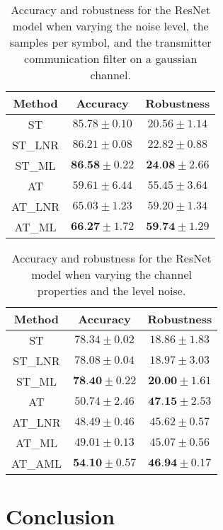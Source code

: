 \documentclass[conference]{IEEEtran}
\begin{document}
\begin{table}[htbp]
	\centering
	\begin{tabular}{c|cc}
	    Method & Accuracy & Robustness \\
		\hline
		ST & $85.78 \pm 0.10$ & $20.56 \pm 1.14$ \\ 
		ST\_LNR & $86.21 \pm 0.08$ & $22.82 \pm 0.88$ \\ 
		ST\_ML & $\textbf{86.58} \pm 0.22$ & $\textbf{24.08} \pm 2.66$ \\
        \hline
		AT & $59.61 \pm 6.44$ & $55.45 \pm 3.64$ \\ 
		AT\_LNR & $65.03 \pm 1.23$ & $59.20 \pm 1.34$ \\ 
		AT\_ML & $\textbf{66.27} \pm 1.72$ & $\textbf{59.74} \pm 1.29$ \\ 
    \end{tabular}
    \caption{Accuracy and robustness for the ResNet model when varying the noise level, the samples per symbol, and the transmitter communication filter on a gaussian channel.}
    \label{tab:sawgn2p}
\end{table}

\begin{table}[htbp]
	\centering
	\begin{tabular}{c|cc}
	    Method & Accuracy & Robustness \\
		\hline
		ST & $78.34 \pm 0.02$ & $18.86 \pm 1.83$ \\ 
		ST\_LNR & $78.08 \pm 0.04$ & $18.97 \pm 3.03$ \\ 
		ST\_ML & $\textbf{78.40} \pm 0.22$ & $\textbf{20.00} \pm 1.61$ \\
		\hline
		AT & $50.74 \pm 2.46$ & $\textbf{47.15} \pm 2.53$ \\ 
		AT\_LNR & $48.49 \pm 0.46$ & $45.62 \pm 0.57$ \\ 
		AT\_ML & $49.01 \pm 0.13$ & $45.07 \pm 0.56$ \\  
		AT\_AML & $\textbf{54.10} \pm 0.57$ & $\textbf{46.94} \pm 0.17$ \\ 
    \end{tabular}
    \caption{Accuracy and robustness for the ResNet model when varying the channel properties and the level noise.}
    \label{tab:sp0c20}
\end{table}


\section{Conclusion}
\end{document}
